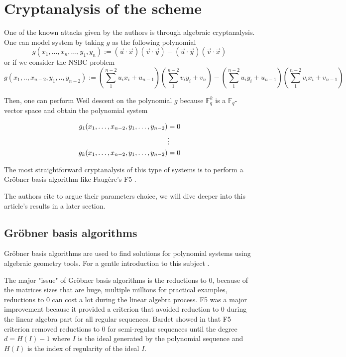 \documentclass[english]{article}
\begin{document}
		\section{Cryptanalysis of the scheme}
		One of the known attacks given by the authors is through algebraic cryptanalysis.
		One can model system by taking $g$ as the following polynomial
		$$
		g(x_1,...,x_n,...,y_1,y_n) := (\vec{u} \cdot \vec{x})(\vec{v} \cdot \vec{y}) - (\vec{u} \cdot \vec{y})(\vec{v} \cdot \vec{x})
		$$
		or if we consider the NSBC problem
		$$
		g(x_1,..,x_{n-2},y_1,..,y_{n-2}) := (\sum_{1}^{n-2}u_{i}x_{i} + u_{n-1})(\sum_{1}^{n-2}v_{i}y_{i} + v_{n}) - (\sum_{1}^{n-2}u_{i}y_{i} + u_{n-1})(\sum_{1}^{n-2}v_{i}x_{i} + v_{n-1})
		$$
		
		Then, one can perform Weil descent on the polynomial $g$ because $\mathbb{F}_q^k$ is a $\mathbb{F}_q$-vector space and obtain the polynomial system
		

		\begin{align}
			g_1(x_1, \dots, x_{n-2}, y_1, \dots, y_{n-2}) &= 0 \notag \\
			&\vdots \notag \\
			g_k(x_1, \dots, x_{n-2}, y_1, \dots, y_{n-2}) &= 0 \notag
		\end{align}
		
		The most straightforward cryptanalysis of this type of systems is to perform a Gröbner basis algorithm like Faugère's F5 \cite{F02}.
		
		The authors cite \cite{FSS11} to argue their parameters choice, we will dive deeper into this article's results in a later section.

		\subsection{Gröbner basis algorithms}
		Gröbner basis algorithms are used to find solutions for polynomial systems using algebraic geometry tools. For a gentle introduction to this subject \cite{CLS}.
		
		The major "issue" of Gröbner basis algorithms is the reductions to 0, because of the matrices sizes that are huge, multiple millions for practical examples,
		reductions to 0 can cost a lot during the linear algebra process. F5 \cite{F02} was a major improvement because it provided a criterion that avoided reduction to 0 during the linear algebra part for all regular sequences.
		Bardet showed in \cite{Bardet04} that F5 criterion removed reductions to 0 for semi-regular sequences until the degree $d = H(I) -1$ where $I$ is the ideal generated by the polynomial sequence and $H(I)$ is the index of regularity of the ideal $I$.
			
\printbibliography
\end{document}
